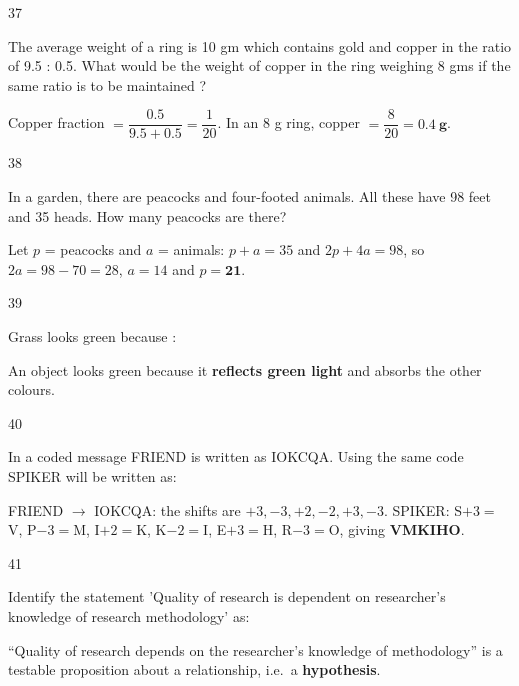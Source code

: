 \begin{question}{37}
{The average weight of a ring is 10 gm which contains gold and copper in the ratio of 9.5 : 0.5. What would be the weight of copper in the ring weighing 8 gms if the same ratio is to be maintained ?\par}
\begin{explain}
Copper fraction $=\dfrac{0.5}{9.5+0.5}=\dfrac{1}{20}$. In an 8 g ring, copper $=\dfrac{8}{20}=\mathbf{0.4\ g}$.
\end{explain}
\end{question}

\begin{question}{38}
{In a garden, there are peacocks and four-footed animals. All these have 98 feet and 35 heads. How many peacocks are there?\par}
\begin{explain}
Let $p$ = peacocks and $a$ = animals: $p+a=35$ and $2p+4a=98$, so $2a=98-70=28$, $a=14$ and $p=\mathbf{21}$.
\end{explain}
\end{question}

\begin{question}{39}
{Grass looks green because :\par}
\begin{explain}
An object looks green because it \textbf{reflects green light} and absorbs the other colours.
\end{explain}
\end{question}

\begin{question}{40}
{In a coded message FRIEND is written as IOKCQA. Using the same code SPIKER will be written as:\par}
\begin{explain}
FRIEND $\rightarrow$ IOKCQA: the shifts are $+3, -3, +2, -2, +3, -3$.
SPIKER: S$+3=$V, P$-3=$M, I$+2=$K, K$-2=$I, E$+3=$H, R$-3=$O, giving \textbf{VMKIHO}.
\end{explain}
\end{question}

\begin{question}{41}
{Identify the statement 'Quality of research is dependent on researcher's knowledge of research methodology' as:\par}
\begin{explain}
``Quality of research depends on the researcher's knowledge of methodology'' is a testable proposition about a relationship, i.e.\ a \textbf{hypothesis}.
\end{explain}
\end{question}

